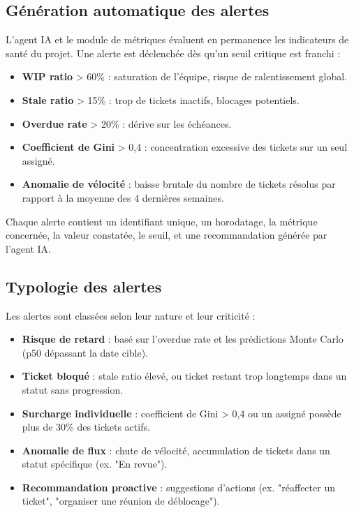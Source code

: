 \subsection{Génération automatique des alertes}
L’agent IA et le module de métriques évaluent en permanence les indicateurs de santé du projet. Une alerte est déclenchée dès qu’un seuil critique est franchi :
\begin{itemize}
    \renewcommand{\labelitemi}{—}
    \item \textbf{WIP ratio} > 60\% : saturation de l’équipe, risque de ralentissement global.
    \item \textbf{Stale ratio} > 15\% : trop de tickets inactifs, blocages potentiels.
    \item \textbf{Overdue rate} > 20\% : dérive sur les échéances.
    \item \textbf{Coefficient de Gini} > 0,4 : concentration excessive des tickets sur un seul assigné.
    \item \textbf{Anomalie de vélocité} : baisse brutale du nombre de tickets résolus par rapport à la moyenne des 4 dernières semaines.
\end{itemize}
Chaque alerte contient un identifiant unique, un horodatage, la métrique concernée, la valeur constatée, le seuil, et une recommandation générée par l’agent IA.

\subsection{Typologie des alertes}
Les alertes sont classées selon leur nature et leur criticité :
\begin{itemize}
    \renewcommand{\labelitemi}{—}
    \item \textbf{Risque de retard} : basé sur l’overdue rate et les prédictions Monte Carlo (p50 dépassant la date cible).
    \item \textbf{Ticket bloqué} : stale ratio élevé, ou ticket restant trop longtemps dans un statut sans progression.
    \item \textbf{Surcharge individuelle} : coefficient de Gini > 0,4 ou un assigné possède plus de 30\% des tickets actifs.
    \item \textbf{Anomalie de flux} : chute de vélocité, accumulation de tickets dans un statut spécifique (ex. "En revue").
    \item \textbf{Recommandation proactive} : suggestions d’actions (ex. "réaffecter un ticket", "organiser une réunion de déblocage").
\end{itemize}

